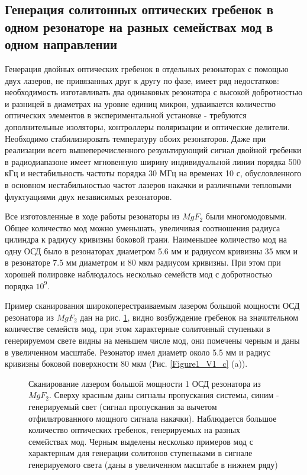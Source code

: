 \subsection{Генерация солитонных оптических гребенок в одном резонаторе на разных семействах мод в одном направлении}

Генерация двойных оптических гребенок в отдельных резонаторах с помощью двух лазеров, не привязанных друг к другу по фазе, имеет ряд недостатков: необходимость изготавливать два одинаковых резонатора с высокой добротностью и разницей в диаметрах на уровне единиц микрон, удваивается количество оптических элементов в экспериментальной установке - требуются дополнительные изоляторы, контроллеры поляризации и оптические делители. Необходимо стабилизировать температуру обоих резонаторов. Даже при реализации всего вышеперечисленного результирующий сигнал двойной гребенки в радиодиапазоне имеет мгновенную ширину индивидуальной линии порядка 500 кГц и нестабильность частоты порядка 30 МГц на временах 10 с, обусловленного в основном нестабильностью частот лазеров накачки и различными тепловыми флуктуациями двух независимых резонаторов.

Все изготовленные в ходе работы резонаторы из $MgF_2$ были многомодовыми. Общее количество мод можно уменьшать, увеличивая соотношения радиуса цилиндра к радиусу кривизны боковой грани. Наименьшее количество мод на одну ОСД было в резонаторах диаметром 5.6 мм и радиусом кривизны 35 мкм и в резонаторе 7.5 мм диаметром и 80 мкм радиусом кривизны. При этом при хорошей полировке наблюдалось несколько семейств мод с добротностью порядка $10^9$.

Пример сканирования широкоперестраиваемым лазером большой мощности ОСД резонатора из $MgF_2$ дан на рис. \ref{Scan_SolitonSpot}, видно возбуждение гребенок на значительном количестве семейств мод, при этом характерные солитонный ступеньки в генерируемом свете видны на меньшем числе мод, они помечены черным и даны в увеличенном масштабе. Резонатор имел диаметр около 5.5 мм и радиус кривизны боковой поверхности 80 мкм (Рис. \ref{Figure1_V1_c} (a)).

\begin{figure}[ht]
\begin{minipage}[ht]{1\linewidth}
\end{minipage}
\caption{Сканирование лазером большой мощности 1 ОСД резонатора из $MgF_2$. Сверху красным даны сигналы пропускания системы, синим - генерируемый свет (сигнал пропускания за вычетом отфильтрованного мощного сигнала накачки). Наблюдается большое количество оптических гребенок, генерируемых на разных семействах мод. Черным выделены несколько примеров мод с характерным для генерации солитонов ступеньками в сигнале генерируемого света (даны в увеличенном масштабе в нижнем ряду)}
\label{Scan_SolitonSpot}
\end{figure}

